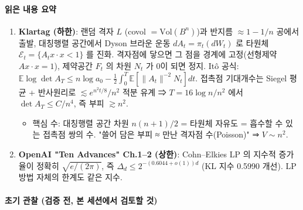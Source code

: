 \hypertarget{uxc77duxc740-uxb0b4uxc6a9-uxc694uxc57d}{%
\paragraph{읽은 내용 요약}\label{uxc77duxc740-uxb0b4uxc6a9-uxc694uxc57d}}

\begin{enumerate}
\def\labelenumi{\arabic{enumi}.}
\tightlist
\item
  \textbf{Klartag (하한)}: 랜덤 격자 \(L\) (covol \(=\mathrm{Vol}(B^n)\))과 반지름 \(\approx 1-1/n\) 공에서 출발, 대칭행렬 공간에서 Dyson 브라운 운동 \(dA_t=\pi_t(dW_t)\) 로 타원체 \(\mathcal E_t=\{A_tx\cdot x<1\}\) 를 진화. 격자점에 닿으면 그 점을 경계에 고정(선형제약 \(A x\cdot x=1\)), 제약공간 \(F_t\) 의 차원 \(N_t\) 가 0이 되면 정지. Itô 공식: \(\mathbb E\log\det A_T\le n\log a_0-\tfrac12\int_0^T\mathbb E[\|A_t\|^{-2}N_t]dt\). 접촉점 기대개수는 Siegel 평균 + 반사원리로 \(\lesssim e^{n^2t/8}/n^2\) 적분 유계 ⇒ \(T=16\log n/n^2\) 에서 \(\det A_T\le C/n^4\), 즉 부피 \(\gtrsim n^2\).

  \begin{itemize}
  \tightlist
  \item
    핵심 수: 대칭행렬 공간 차원 \(n(n+1)/2\) = 타원체 자유도 = 흡수할 수 있는 접촉점 쌍의 수. "쓸어 담은 부피 ≈ 만난 격자점 수(Poisson)" ⇒ \(V\sim n^2\).
  \end{itemize}
\item
  \textbf{OpenAI "Ten Advances" Ch.1--2 (상한)}: Cohn--Elkies LP 의 지수적 증가율이 정확히 \(\sqrt{e/(2\pi)}\), 즉 \(\Delta_d\le 2^{-(0.6044+o(1))d}\) (KL 지수 0.5990 개선). LP 방법 자체의 한계도 같은 지수.
\end{enumerate}

\hypertarget{uxcd08uxae30-uxad00uxcc30-uxac80uxc99d-uxc804-uxbcf8-uxc138uxc158uxc5d0uxc11c-uxac80uxd1a0uxd560-uxac83}{%
\paragraph{초기 관찰 (검증 전, 본 세션에서 검토할 것)}\label{uxcd08uxae30-uxad00uxcc30-uxac80uxc99d-uxc804-uxbcf8-uxc138uxc158uxc5d0uxc11c-uxac80uxd1a0uxd560-uxac83}}

